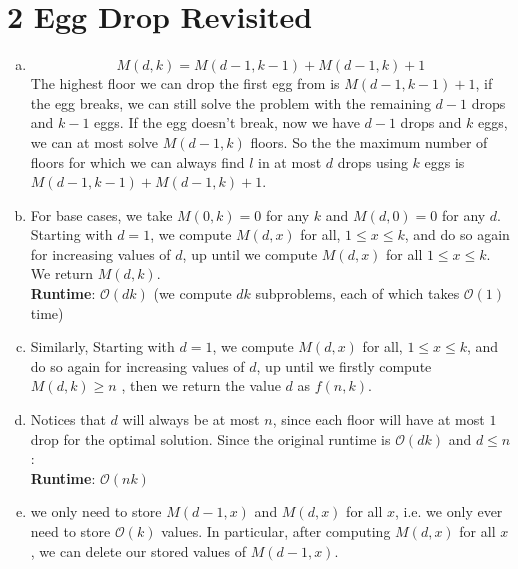 \documentclass[11pt]{article}
\def\rt{\textbf{Runtime}: }
\newenvironment{qparts}{\begin{enumerate}[(a)]}{\end{enumerate}}
\begin{document}
	\section*{2  Egg Drop Revisited}
	\begin{qparts}
		\item 
		$$M(d, k) = M(d-1, k-1) + M(d-1, k) + 1$$
		The highest floor we can drop the first egg from is $M(d-1, k-1) +1$, if the egg breaks, we can still solve the problem with the remaining $d-1$ drops and $k-1$ eggs. If the egg doesn't break, now we have $d-1$ drops and $k$ eggs, we can at most solve $M(d-1, k)$ floors. So the  the maximum number of floors for which we can always find $l$ in at most $d$ drops using $k$ eggs is $M(d-1, k-1) + M(d-1, k) + 1$.  
		
		\item 
		For base cases, we take $M(0, k) = 0$ for any $k$ and $M(d, 0) = 0$ for any $d$. Starting with $d = 1$, we compute $M(d, x)$ for all, $1 \leq x \leq k$, and do so again for increasing values of $d$, up until we compute $M(d, x)$ for all $1 \leq x \leq k$. We return $M(d, k)$.\\
		\rt $\mathcal{O}(dk)$ (we compute $dk$ subproblems, each of which takes $\mathcal{O}(1)$ time)
		
		\item 
		Similarly, Starting with $d = 1$, we compute $M(d, x)$ for all, $1 \leq x \leq k$, and do so again for increasing values of $d$, up until we firstly compute $M(d, k)\geq n$ , then we return the value $d$ as $f(n, k)$.
		
		\item Notices that $d$ will always be at most $n$, since each floor will have at most $1$ drop for the optimal solution. Since the original runtime is $\mathcal{O}(dk)$ and $d \leq n$:\\
		\rt $\mathcal{O}(nk)$
		
		\item we only need to store $M(d - 1, x)$ and $M(d, x)$ for all $x$, i.e. we only ever need to store $\mathcal{O}(k)$ values. In particular, after computing $M(d, x)$ for all $x$, we can delete our stored values of $M(d - 1, x)$.
	\end{qparts}
	
\end{document}
